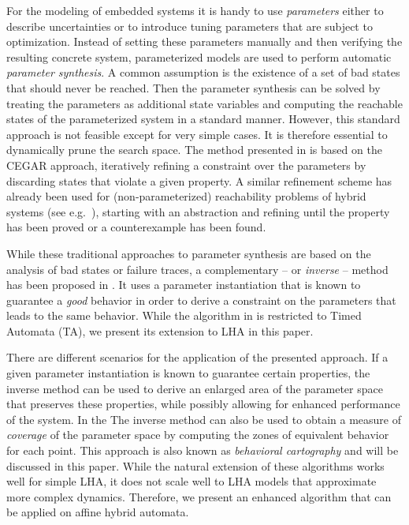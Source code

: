 \documentclass{llncs}
\begin{document}
For the modeling of embedded systems it is handy to use
\emph{parameters} either to describe uncertainties or to introduce
tuning parameters that are subject to optimization. Instead of setting
these parameters manually and then verifying the resulting concrete
system, parameterized models are used to perform automatic
\emph{parameter synthesis}. A common assumption is the existence of a
set of bad states that should never be reached. Then the parameter
synthesis can be solved by treating the parameters as additional state
variables and computing the reachable states of the parameterized
system in a standard manner\cite{HHW:97}. However, this standard
approach is not feasible except for very simple cases. It is therefore
essential to dynamically prune the search space. The method presented
in \cite{FJK:2008} is based on the CEGAR
approach, iteratively refining a constraint over the parameters by
discarding states that violate a given property. A similar refinement scheme
has already been used for (non-parameterized) reachability problems of hybrid
systems (see e.g.~\cite{JKWC:2007}), starting with an abstraction and refining until the property has been
proved or a counterexample has been found.

While these traditional approaches to parameter synthesis are based on
the analysis of bad states or failure traces, a complementary -- or
\emph{inverse} -- method has been proposed in \cite{ACEF:2009}. It
uses a parameter instantiation that is known to guarantee a
\emph{good} behavior in order to derive a constraint on the parameters
that leads to the same behavior. While the algorithm in
\cite{ACEF:2009} is restricted to Timed Automata (TA), we present its
extension to LHA in this paper. 

There are different scenarios for the application of the presented
approach. If a given parameter instantiation is known to guarantee
certain properties, the inverse method can be used to derive an
enlarged area of the parameter space that preserves these properties,
while possibly allowing for enhanced performance of the system. 
In the
The inverse method can %
also be used to obtain a measure
of \emph{coverage} of the parameter space by computing the zones of
equivalent behavior for each point. This approach is also known as
\emph{behavioral cartography} \cite{AF:2010} and will be discussed in
this paper. While the natural extension of these algorithms works well
for simple LHA, it does not scale well to LHA models that approximate
more complex dynamics. Therefore, we present an enhanced algorithm
that can be applied on affine hybrid automata.
\end{document}
